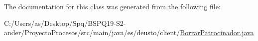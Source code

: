 The documentation for this class was generated from the following file\+:\begin{DoxyCompactItemize}
\item 
C\+:/\+Users/as/\+Desktop/\+Spq/\+B\+S\+P\+Q19-\/\+S2-\/ander/\+Proyecto\+Procesos/src/main/java/es/deusto/client/\mbox{\hyperlink{_borrar_patrocinador_8java}{Borrar\+Patrocinador.\+java}}\end{DoxyCompactItemize}
